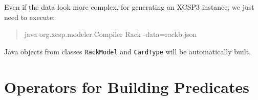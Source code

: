 \documentclass[10pt]{article}
\def\xt{{\rm XCSP3}\xspace}
\newcommand{\nn}[1]{{\tt #1}} %
\def\xt{{\rm XCSP3}\xspace}
\newenvironment{myvb}{\endgraf\small\verbatim}{\endverbatim}
\begin{document}
Even if the data look more complex, for generating an \xt instance, we just need to execute: 
\begin{quote}
\begin{myvb}
java org.xcsp.modeler.Compiler Rack -data=rackb.json
\end{myvb}
\end{quote}

Java objects from classes \nn{RackModel} and \nn{CardType} will be automatically built.




\pagebreak
\appendix

\section{Operators for Building Predicates}\label{app:ops}
\end{document}
